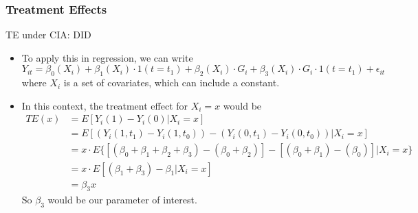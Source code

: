 \documentclass{beamer}
\begin{document}
\begin{frame}
\frametitle{Treatment Effects}
TE under CIA: DID
\begin{itemize}
\item To  apply this in regression, we can write
\[
Y_{it}=\beta_0(X_i)+\beta_1(X_i)\cdot1(t=t_1)+\beta_2(X_i)\cdot G_i + \beta_3(X_i)\cdot G_i\cdot1(t=t_1)+\epsilon_{it}
\]
where $X_i$ is a set of covariates, which can include a constant. 
\item In this context, the treatment effect for $X_i=x$ would be
\footnotesize{\begin{align*}
TE(x)&=E[Y_i(1)-Y_i(0)|X_i=x]\\
&=E[(Y_i(1,t_1)-Y_i(1,t_0))-(Y_i(0,t_1)-Y_i(0,t_0))|X_i=x]\\
&=x\cdot E\{[(\beta_0+\beta_1+\beta_2+\beta_3)-(\beta_0+\beta_2)]-[(\beta_0+\beta_1)-(\beta_0)]|X_i=x\}\\
&=x\cdot E[(\beta_1+\beta_3)-\beta_1|X_i=x]\\
&=\beta_3 x
\end{align*}}\normalsize
So $\beta_3$ would be our parameter of interest.
\end{itemize}
\end{frame}
\end{document}
